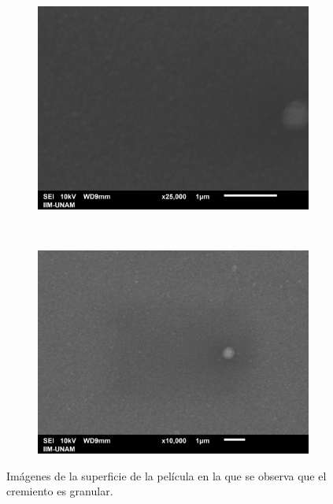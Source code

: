 \documentclass[12pt]{IEEEtran}
\begin{document}
\begin{figure}[ht]
	\centering
	\begin{subfigure}[b]{0.45\textwidth}
		\centering
		\includegraphics[width=\linewidth]{Al-sup-0001.png}
	\end{subfigure}%
	~
	\begin{subfigure}[b]{0.45\textwidth}
		\centering
		\includegraphics[width=\linewidth]{Al-sup-0002.png}
	\end{subfigure}
	\caption{Imágenes de la superficie de la película en la que se observa que el cremiento es granular.}
	\label{fig:SEM-superficie}
\end{figure}
\end{document}
